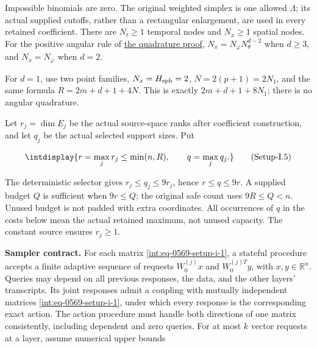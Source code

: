 
Impossible binomials are zero. The original weighted simplex is one allowed \(\Lambda\); its actual supplied cutoffs, rather than a rectangular enlargement, are used in every retained coefficient. There are \(N_t\ge1\) temporal nodes and \(N_x\ge1\) spatial nodes. For the positive angular rule of \hyperref[int:setup-quadrature]{the quadrature proof}, \(N_x=N_\varphi N_\theta^{d-2}\) when \(d\ge3\), and \(N_x=N_\varphi\) when \(d=2\).



For \(d=1\), use two point families, \(N_x=H_{\rm sph}=2\), \(N=2(p+1)=2N_1\), and the same formula \(R=2m+d+1+4N\). This is exactly \(2m+d+1+8N_1\); there is no angular quadrature.



Let \(r_j=\dim E_j\) be the actual source-space ranks after coefficient construction, and let \(q_j\) be the actual selected support sizes. Put


\label{int:eq-setup-i-5}
\begingroup\renewcommand{\theHequation}{intdisplay.1086}
\begin{equation}
\intdisplay{
r=\max_jr_j\le\min(n,R),\qquad q=\max_jq_j.
}
\tag{Setup-I.5}
\label{int:eq-0573-setup-i-5}
\end{equation}
\endgroup


The deterministic selector gives \(r_j\le q_j\le9r_j\), hence \(r\le q\le9r\). A supplied budget \(Q\) is sufficient when \(9r\le Q\); the original safe count uses \(9R\le Q<n\). Unused budget is not padded with extra coordinates. All occurrences of \(q\) in the costs below mean the actual retained maximum, not unused capacity. The constant source ensures \(r_j\ge1\).



\textbf{Sampler contract.} For each matrix \hyperref[int:eq-setup-i-1]{\eqref{int:eq-0569-setup-i-1}}, a stateful procedure accepts a finite adaptive sequence of requests \(W_0^{(j)}x\) and \(W_0^{(j)T}y\), with \(x,\allowbreak y\in\mathbb R^n\). Queries may depend on all previous responses, the data, and the other layers' transcripts. Its joint responses admit a coupling with mutually independent matrices \hyperref[int:eq-setup-i-1]{\eqref{int:eq-0569-setup-i-1}}, under which every response is the corresponding exact action. The action procedure must handle both directions of one matrix consistently, including dependent and zero queries. For at most \(k\) vector requests at a layer, assume numerical upper bounds


